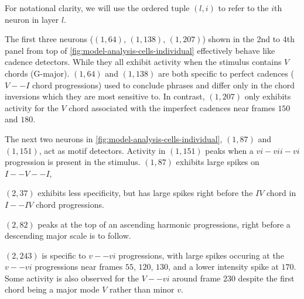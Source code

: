 For notational clarity, we will use the ordered tuple $(l,i)$ to refer to the
$i$th neuron in layer $l$.

The first three neurons ($(1,64)$, $(1,138)$, $(1,207)$) shown in the 2nd to
4th panel from top of \cref{fig:model-analysis-cells-individual} effectively
behave like cadence detectors. While they all exhibit activity when the
stimulus contains $V$ chords (\ie G-major). $(1,64)$ and $(1,138)$ are both
specific to perfect cadences (\ie $V -- I$ chord progressions) used to
conclude phrases and differ only in the chord inversions which they are most
sensitive to. In contrast, $(1,207)$ only exhibits activity for the $V$ chord
associated with the imperfect cadences near frames $150$ and $180$.

The next two neurons in \cref{fig:model-analysis-cells-individual}, $(1,87)$
and $(1,151)$, act as motif detectors. Activity in $(1,151)$ peaks when a $vi-vii-vi$
progression is present in the stimulus. $(1,87)$ exhibits large spikes on $I--V--I$,

$(2,37)$ exhibits less specificity, but has large spikes right before the $IV$ chord
in $I--IV$ chord progressions.

$(2,82)$ peaks at the top of an ascending harmonic progressions, right before a descending
major scale is to follow.

$(2, 243)$ is specific to $v -- vi$ progressions, with large spikes occuring at
the $v -- vi$ progressions near frames $55$, $120$, $130$, and a lower intensity spike at
$170$. Some activity is also observed for the $V -- vi$ around frame $230$ despite
the first chord being a major mode $V$ rather than minor $v$.

